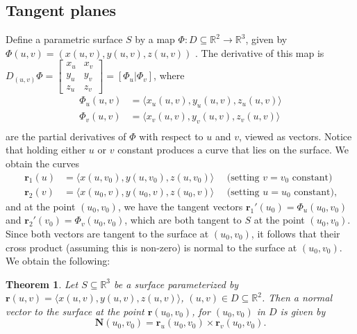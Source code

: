 \documentclass[12pt,letterpaper]{article}
\newtheorem{theorem}{Theorem}
\newcommand{\R}{\mathbb{R}}
\renewcommand{\r}{\mathbf{r}}
\newcommand{\N}{\mathbf{N}}
\begin{document}
 \subsection{Tangent planes}
Define a parametric surface $S$ by a map $\Phi:D\subseteq \R^2\to \R^3$, given by $\Phi(u,v) = (x(u,v), y(u,v), z(u,v))$ . The derivative of this map is $D_{(u,v)}\Phi = \begin{bmatrix} x_u & x_v\\y_u&y_v\\z_u&z_v\end{bmatrix} = [\Phi_u | \Phi_v]$, where 
\begin{align*}
 \Phi_u(u,v) &= \langle x_u(u,v), y_u(u,v), z_u(u,v)\rangle\\
 \Phi_v(u,v) &= \langle x_v(u,v), y_v(u,v), z_v(u,v)\rangle\\
\end{align*}
are the partial derivatives of $\Phi$ with respect to $u$ and $v$, viewed as vectors. Notice that holding either $u$ or $v$ constant produces a curve that lies on the surface. We obtain the curves
\begin{align*}
 \r_1(u) &= \langle x(u,v_0), y(u,v_0), z(u,v_0)\rangle \quad \text{ (setting $v=v_0$ constant)}\\
 \r_2(v) &= \langle x(u_0,v), y(u_0,v), z(u_0, v)\rangle \quad \text{ (setting $u=u_0$ constant),}
\end{align*}
and at  the point $(u_0,v_0)$, we have the tangent vectors $\r_1'(u_0) = \Phi_u(u_0,v_0)$ and $\r_2'(v_0)=\Phi_v(u_0,v_0)$, which are both tangent to $S$ at the point $(u_0,v_0)$. Since both vectors are tangent to the surface at $(u_0,v_0)$, it follows that their cross product (assuming this is non-zero) is normal to the surface at $(u_0,v_0)$. We obtain the following:
\begin{theorem}
 Let $S\subseteq \R^3$ be a surface parameterized by $\r(u,v) = \langle x(u,v), y(u,v), z(u,v)\rangle$, $(u,v)\in D\subseteq \R^2$. Then a normal vector to the surface at the point $\r(u_0,v_0)$, for $(u_0,v_0)$ in $D$ is given by
\[
 \N(u_0,v_0) = \r_u(u_0,v_0)\times \r_v(u_0,v_0).
\]
\end{theorem}
\end{document}
